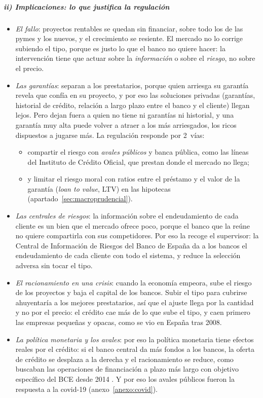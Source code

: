 \documentclass[11pt]{article}
\begin{document}
\subparagraph{ii) Implicaciones: lo que justifica la regulación}

\begin{itemize}
\item \emph{El fallo}: proyectos rentables se quedan sin financiar, sobre todo los de las pymes y los nuevos, y el crecimiento se resiente. El mercado no lo corrige subiendo el tipo, porque es justo lo que el banco no quiere hacer: la intervención tiene que actuar sobre la \emph{información} o sobre el \emph{riesgo}, no sobre el precio.
\item \emph{Las garantías}: separan a los prestatarios, porque quien arriesga su garantía revela que confía en su proyecto, y por eso las soluciones privadas (garantías, historial de crédito, relación a largo plazo entre el banco y el cliente) llegan lejos. Pero dejan fuera a quien no tiene ni garantías ni historial, y una garantía muy alta puede volver a atraer a los más arriesgados, los ricos dispuestos a jugarse más\nocite{StiglitzWeiss1981Credit}. La regulación responde por 2~vías:
  \begin{itemize}
  \item compartir el riesgo con \emph{avales públicos} y banca pública, como las líneas del Instituto de Crédito Oficial, que prestan donde el mercado no llega;
  \item y limitar el riesgo moral con ratios entre el préstamo y el valor de la garantía (\emph{loan to value}, LTV) en las hipotecas (apartado~\ref{sec:macroprudencial}).
  \end{itemize}
\item \emph{Las centrales de riesgos}: la información sobre el endeudamiento de cada cliente es un bien que el mercado ofrece poco, porque el banco que la reúne no quiere compartirla con sus competidores. Por eso la recoge el supervisor: la Central de Información de Riesgos del Banco de España da a los bancos el endeudamiento de cada cliente con todo el sistema, y reduce la selección adversa sin tocar el tipo.
\item \emph{El racionamiento en una crisis}: cuando la economía empeora, sube el riesgo de los proyectos y baja el capital de los bancos. Subir el tipo para cubrirse ahuyentaría a los mejores prestatarios, así que el ajuste llega por la cantidad y no por el precio: el crédito cae más de lo que sube el tipo, y caen primero las empresas pequeñas y opacas, como se vio en España tras 2008\nocite{JimenezEtAl2012Credit}.
\item \emph{La política monetaria y los avales}: por eso la política monetaria tiene efectos reales por el crédito: si el banco central da más fondos a los bancos, la oferta de crédito se desplaza a la derecha y el racionamiento se reduce, como buscaban las operaciones de financiación a plazo más largo con objetivo específico del BCE desde 2014 . Y por eso los avales públicos fueron la respuesta a la covid-19 (anexo~\ref{anexo:covid}).
\end{itemize}
\end{document}
